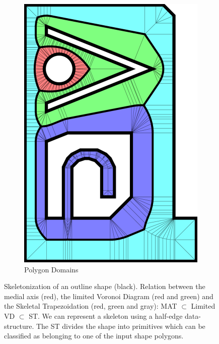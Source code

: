 \begin{figure}
\begin{subfigure}{\figwidth}
\includegraphics[height=\figwidthTwo]{sources/method/domains.pdf}
\caption{Polygon Domains}\label{shape_decomposition_domains}
\end{subfigure}
\caption{
Skeletonization of an outline shape (black).
Relation between the medial axis (red), the limited Voronoi Diagram (red and green) and the Skeletal Trapezoidation (red, green and gray): MAT $\subset$ Limited VD $\subset$ ST.
 We can represent a skeleton using a half-edge data-structure.
 The ST divides the shape into primitives which can be classified as belonging to one of the input shape polygons.
}
\label{skeletonization_comparison}
\end{figure}



